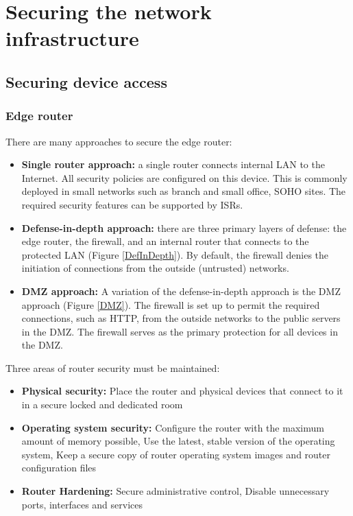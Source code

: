 \chapter{Securing the network infrastructure}

\section{Securing device access}

\subsection{Edge router}

There are many approaches to secure the edge router:

\begin{itemize}
\item \textbf{Single router approach:}  a single router connects internal LAN to the Internet.  All security policies are configured on this device. This is commonly deployed in small networks such as branch and small office, SOHO sites. The required security features can be supported by ISRs.

\item \textbf{Defense-in-depth approach:} there are three primary layers of defense: the edge router, the firewall, and an internal router that connects to the protected LAN (Figure \ref{DefInDepth}). By default, the firewall denies the initiation of connections from the outside (untrusted) networks. 

\item \textbf{DMZ approach:} A variation of the defense-in-depth approach is the  DMZ approach (Figure \ref{DMZ}). The firewall is set up to permit the required connections, such as HTTP, from the outside networks to the public servers in the DMZ. The firewall serves as the primary protection for all devices in the DMZ.
\end{itemize}

Three areas of router security must be maintained:

\begin{itemize}
\item \textbf{Physical security:} Place the router and physical devices that connect to it in a secure locked and dedicated room 

\item \textbf{Operating system security:} Configure the router with the maximum amount of memory possible, Use the latest, stable version of the operating system, Keep a secure copy of router operating system images and router configuration files

\item \textbf{Router Hardening:} Secure administrative control, Disable unnecessary ports, interfaces and services
\end{itemize}

